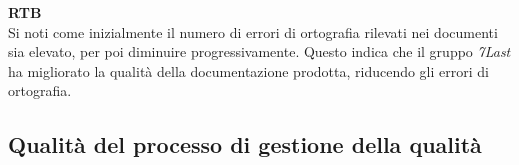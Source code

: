 \begin{flushleft}
\textbf{RTB} \\
Si noti come inizialmente il numero di errori di ortografia rilevati nei documenti sia elevato, per poi diminuire progressivamente. Questo indica che il gruppo \textit{7Last} ha migliorato la qualità della documentazione prodotta, riducendo gli errori di ortografia. \\
\end{flushleft}

\newpage
\subsection{Qualità del processo di gestione della qualità}
